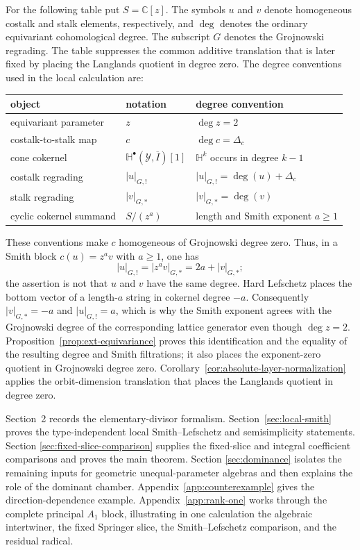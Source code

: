 \documentclass[11pt]{amsart}
\theoremstyle{definition}
\theoremstyle{remark}
\begin{document}
For the following table put $S=\mathbb C[z]$.  The symbols $u$ and $v$ denote
homogeneous costalk and stalk elements, respectively, and $\deg$ denotes the
ordinary equivariant cohomological degree.  The subscript $G$ denotes the
Grojnowski regrading.  The table suppresses the common additive
translation that is later fixed by placing the Langlands quotient in degree
zero.  The degree conventions used in the local calculation are:
\begin{center}
\begin{tabular}{@{}lll@{}}
\toprule
object & notation & degree convention\\
\midrule
equivariant parameter & $z$ & $\deg z=2$\\
costalk-to-stalk map & $c$ & $\deg c=\Delta_c$\\
cone cokernel & $\mathbb H^\bullet(\mathcal Y,\overline I)[1]$
  & $\mathbb H^k$ occurs in degree $k-1$\\
costalk regrading & $|u|_{G,!}$ & $|u|_{G,!}=\deg(u)+\Delta_c$\\
stalk regrading & $|v|_{G,*}$ & $|v|_{G,*}=\deg(v)$\\
cyclic cokernel summand & $S/(z^a)$ & length and Smith exponent $a\geq1$\\
\bottomrule
\end{tabular}
\end{center}
These conventions make $c$ homogeneous of Grojnowski degree zero.  Thus, in
a Smith block $c(u)=z^av$ with $a\geq1$, one has
\[
 |u|_{G,!}=|z^av|_{G,*}=2a+|v|_{G,*};
\]
the assertion is not that $u$ and $v$ have the same degree.  Hard Lefschetz
places the bottom vector of a length-$a$ string in cokernel degree $-a$.
Consequently $|v|_{G,*}=-a$ and $|u|_{G,!}=a$, which is why the Smith
exponent agrees with the Grojnowski degree of the corresponding lattice
generator even though $\deg z=2$.  Proposition~\ref{prop:ext-equivariance}
proves this identification and the equality of the resulting degree and
Smith filtrations; it also places the exponent-zero quotient in Grojnowski
degree zero.
Corollary~\ref{cor:absolute-layer-normalization} applies the orbit-dimension
translation that places the Langlands quotient in degree zero.

Section~2 records the elementary-divisor formalism.
Section~\ref{sec:local-smith} proves the type-independent local
Smith--Lefschetz and semisimplicity statements.  Section
\ref{sec:fixed-slice-comparison} supplies the fixed-slice and integral
coefficient comparisons and proves the main theorem.  Section
\ref{sec:dominance} isolates the remaining inputs for geometric
unequal-parameter algebras and then explains the role of the dominant
chamber.  Appendix~\ref{app:counterexample} gives the direction-dependence
example.  Appendix~\ref{app:rank-one} works through the complete principal
$A_1$ block, illustrating in one calculation the algebraic intertwiner, the
fixed Springer slice, the Smith--Lefschetz comparison, and the residual
radical.
\end{document}
